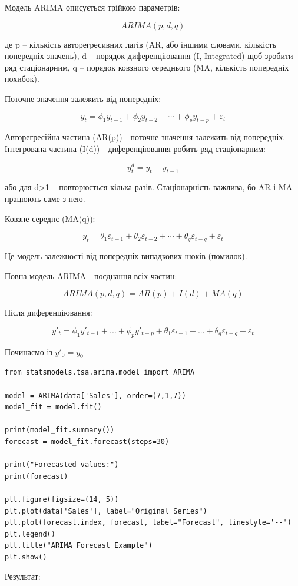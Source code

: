 Модель ARIMA описується трійкою параметрів:

$$ARIMA(p, d, q)$$

де p – кількість авторегресивних лагів (AR, або іншими словами, кількість попередніх значень), d – порядок диференціювання (I, Integrated) щоб зробити ряд стаціонарним, q – порядок ковзного середнього (MA, кількість попередніх похибок).

Поточне значення залежить від попередніх:

$$ y_t = \phi_1 y_{t-1} + \phi_2 y_{t-2} + \cdots + \phi_p y_{t-p} + \varepsilon_t $$

Авторегресійна частина (AR(p)) - поточне значення залежить від попередніх. Інтегрована частина (I(d)) - диференціювання робить ряд стаціонарним:

$$ y^{d}_t = y_t - y_{t-1} $$

або для d>1 – повторюється кілька разів. Стаціонарність важлива, бо AR і MA працюють саме з нею.

Ковзне середнє (MA(q)):

$$ y_t = \theta_1 \varepsilon_{t-1} + \theta_2 \varepsilon_{t-2} + \cdots + \theta_q \varepsilon_{t-q} + \varepsilon_t $$

Це модель залежності від попередніх випадкових шоків (помилок).

Повна модель ARIMA - поєднання всіх частин:

$$ ARIMA(p,d,q) = AR(p) + I(d) + MA(q) $$

Після диференціювання:

$$
y'_t = \phi_1 y'_{t-1} + ... + \phi_p y'_{t-p} +
\theta_1 \varepsilon_{t-1} + ... + \theta_q \varepsilon_{t-q} + \varepsilon_t
$$

Починаємо із $y'_{0} = y_{0}$

\begin{lstlisting}
from statsmodels.tsa.arima.model import ARIMA

model = ARIMA(data['Sales'], order=(7,1,7))
model_fit = model.fit()

print(model_fit.summary())
forecast = model_fit.forecast(steps=30)

print("Forecasted values:")
print(forecast)

plt.figure(figsize=(14, 5))
plt.plot(data['Sales'], label="Original Series")
plt.plot(forecast.index, forecast, label="Forecast", linestyle='--')
plt.legend()
plt.title("ARIMA Forecast Example")
plt.show()
\end{lstlisting}

Результат:

